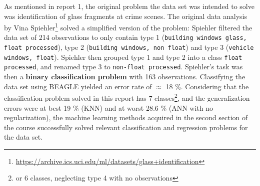 As mentioned in report 1, the original problem the data set was intended to solve was identification of glass fragments at crime scenes. The original data analysis by Vina Spiehler\footnote{\url{ https://archive.ics.uci.edu/ml/datasets/glass+identification}} solved a simplified version of the problem: Spiehler filtered the data set of 214 observations to only contain type 1 (\texttt{building windows glass, float processed}), type 2 (\texttt{building windows, non float}) and type 3 (\texttt{vehicle windows, float}). Spiehler then grouped type 1 and type 2 into a class \texttt{float processed}, and renamed type 3 to \texttt{non-float processed}. Spiehler's task was then a \textbf{binary classification problem} with 163 observations. Classifying the data set using BEAGLE yielded an error rate of $\approx $ 18 \%. Considering that the classification problem solved in this report has 7 classes\footnote{or 6 classes, neglecting type 4 with no observations}, and the generalization errors were at best 19 \% (KNN) and at worst 28.6 \% (ANN with no regularization), the machine learning methods acquired in the second section of the course  successfully solved relevant classification and regression problems for the data set.